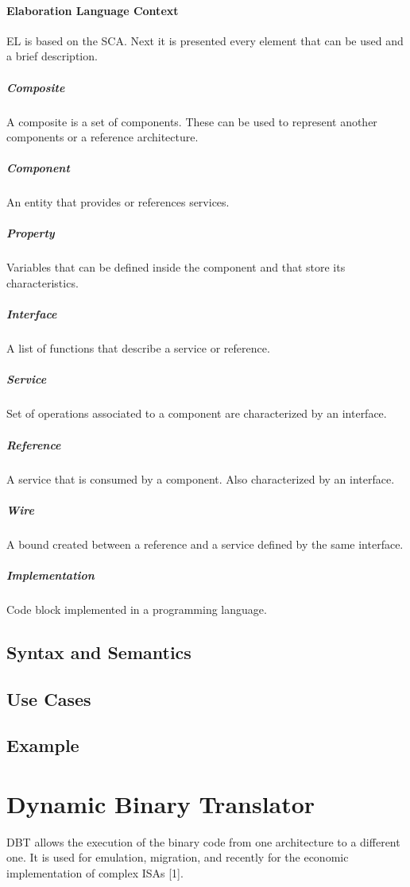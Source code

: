 \documentclass{report}
\begin{document}
			\paragraph{Elaboration Language Context} EL is based on the SCA. Next it is presented every element that can be used and a brief description.

			\subparagraph{Composite} A composite is a set of components. These can be used to represent another components or a reference architecture.

			\subparagraph{Component} An entity that provides or references services. 
			
			\subparagraph{Property} Variables that can be defined inside the component and that store its characteristics. 

			\subparagraph{Interface} A list of functions that describe a service or reference.

			\subparagraph{Service} Set of operations associated to a component are characterized by an interface. 

			\subparagraph{Reference} A service that is consumed by a component. Also characterized by an interface.

			\subparagraph{Wire} A bound created between a reference and a service defined by the same interface.

			\subparagraph{Implementation} Code block implemented in a programming language.

		\subsection{Syntax and Semantics}

		\subsection{Use Cases}

		\subsection{Example}

	\section{Dynamic Binary Translator}
	
		\par DBT allows the execution of the binary code from one architecture to a different one. It is used for emulation, migration, and recently for the economic implementation of complex ISAs [1].
		
\end{document}
